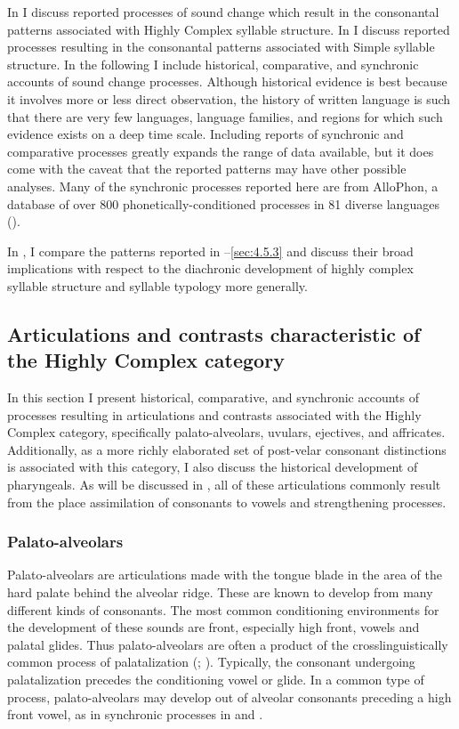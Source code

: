   In  I discuss reported processes of sound change which result in the consonantal patterns associated with Highly Complex syllable structure. In  I discuss reported processes resulting in the consonantal patterns associated with Simple syllable structure. In the following I include historical, comparative, and synchronic accounts of sound change processes. Although historical evidence is best because it involves more or less direct observation, the history of written language is such that there are very few languages, language families, and regions for which such evidence exists on a deep time scale. Including reports of synchronic and comparative processes greatly expands the range of data available, but it does come with the caveat that the reported patterns may have other possible analyses. Many of the synchronic processes reported here are from AlloPhon, a database of over 800 phonetically-conditioned processes in 81 diverse languages (\citealt{BybeeEasterday2019}).

  In , I compare the patterns reported in --\ref{sec:4.5.3} and discuss their broad implications with respect to the diachronic development of highly complex syllable structure and syllable typology more generally.

\subsection{Articulations and contrasts characteristic of the Highly Complex category} \label{sec:4.5.2}

  In this section I present historical, comparative, and synchronic accounts of processes resulting in articulations and contrasts associated with the Highly Complex category, specifically palato-alveolars, uvulars, ejectives, and affricates. Additionally, as a more richly elaborated set of post-velar consonant distinctions is associated with this category, I also discuss the historical development of pharyngeals. As will be discussed in , all of these articulations commonly result from the place assimilation of consonants to vowels and strengthening processes.

\subsubsection{{Palato-alveolars}}\label{sec:4.5.2.1}

  Palato-alveolars are articulations made with the tongue blade in the area of the hard palate behind the alveolar ridge. These are known to develop from many different kinds of consonants. The most common conditioning environments for the development of these sounds are front, especially high front, vowels and palatal glides. Thus palato-alveolars are often a product of the crosslinguistically common process of palatalization (\citealt{Bhat1978}; \citealt{Bateman2007,BybeeEasterday2019}). Typically, the consonant undergoing palatalization precedes the conditioning vowel or glide. In a common type of process, palato-alveolars may develop out of alveolar consonants preceding a high front vowel, as in synchronic processes in   and  .

